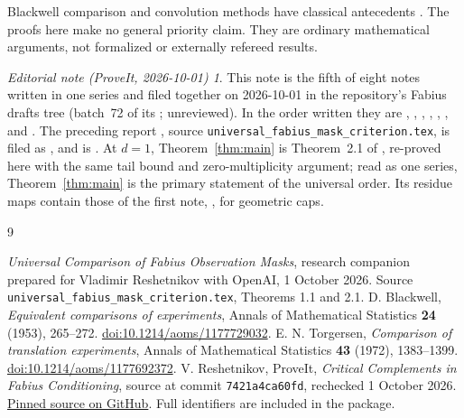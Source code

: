 \documentclass[11pt,a4paper]{article}
\theoremstyle{remark}\newtheorem*{ednote}{Editorial note (ProveIt, 2026-10-01)}
\begin{document}
Blackwell comparison and convolution methods have classical antecedents \cite{Blackwell,Torgersen}. The proofs here make no general priority claim. They are ordinary mathematical arguments, not formalized or externally refereed results.
\begin{ednote}
This note is the fifth of eight notes written in one series and filed together on 2026-10-01 in the repository's Fabius drafts tree (batch~72 of its ; unreviewed). In the order written they are , , , , , ,  and . 
The preceding report \cite{Masks}, source
\texttt{universal\_fabius\_mask\_criterion.tex}, is filed as
, and \cite{Repository} is
. At $d=1$, Theorem~\ref{thm:main} is Theorem~2.1 of
\cite{Masks}, re-proved here with the same tail bound and zero-multiplicity
argument; read as one series, Theorem~\ref{thm:main} is the primary statement
of the universal order. Its residue maps contain those of the first note,
, for geometric caps.
\end{ednote}

\begin{thebibliography}{9}\small\raggedright
\setlength{\itemsep}{3pt}\setlength{\parskip}{0pt}
 \emph{Universal Comparison of Fabius Observation Masks}, research companion prepared for Vladimir Reshetnikov with OpenAI, 1 October 2026. Source \texttt{universal\_fabius\_mask\_criterion.tex}, Theorems 1.1 and 2.1.
 D. Blackwell, \emph{Equivalent comparisons of experiments}, Annals of Mathematical Statistics \textbf{24} (1953), 265--272. \href{https://doi.org/10.1214/aoms/1177729032}{doi:10.1214/aoms/1177729032}.
 E. N. Torgersen, \emph{Comparison of translation experiments}, Annals of Mathematical Statistics \textbf{43} (1972), 1383--1399. \href{https://doi.org/10.1214/aoms/1177692372}{doi:10.1214/aoms/1177692372}.
 V. Reshetnikov, ProveIt, \emph{Critical Complements in Fabius Conditioning}, source at commit \texttt{7421a4ca60fd}, rechecked 1 October 2026. \href{https://github.com/VladimirReshetnikov/ProveIt/blob/7421a4ca60fdf125411edf412f825aac54278b37/Analysis/FabiusFunction/docs/semi-formalized-research-frontiers/drafts/representations/Critical_Complements_Sharp_Information_Loss/article.tex}{Pinned source on GitHub}. Full identifiers are included in the package.
\end{thebibliography}
\end{document}
